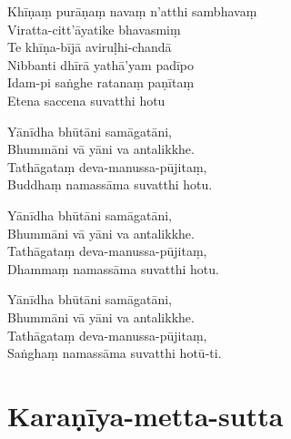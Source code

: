 \begin{paritta}
%
Khīṇaṃ purāṇaṃ navaṃ n'atthi sambhavaṃ\\
Viratta-citt'āyatike bhavasmiṃ\\
Te khīṇa-bījā aviruḷhi-chandā\\
Nibbanti dhīrā yathā'yam padīpo\\
Idam-pi saṅghe ratanaṃ paṇītaṃ\\
Etena saccena suvatthi hotu

Yānīdha bhūtāni samāgatāni,\\
Bhummāni vā yāni va antalikkhe.\\
Tathāgataṃ deva-manussa-pūjitaṃ,\\
Buddhaṃ namassāma suvatthi hotu.

Yānīdha bhūtāni samāgatāni,\\
Bhummāni vā yāni va antalikkhe.\\
Tathāgataṃ deva-manussa-pūjitaṃ,\\
Dhammaṃ namassāma suvatthi hotu.

Yānīdha bhūtāni samāgatāni,\\
Bhummāni vā yāni va antalikkhe.\\
Tathāgataṃ deva-manussa-pūjitaṃ,\\
Saṅghaṃ namassāma suvatthi hotū-ti.

\end{paritta}

\section{Karaṇīya-metta-sutta}

